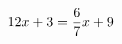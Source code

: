 \documentclass[preview]{standalone}
\begin{document}
\begin{align*}
\special{dvisvgm:raw <g id='unique000'>}12x + 3 = \frac{6}{7}x + 9\special{dvisvgm:raw </g>}
\end{align*}
\end{document}
